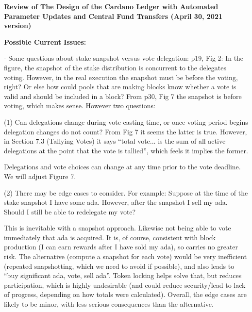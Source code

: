 \documentclass{article}
\begin{document}
\textbf{Review of The Design of the Cardano Ledger with Automated Parameter Updates 
and Central Fund Transfers (April 30, 2021 version)}

\vspace{12pt}
\begin{center}
\textbf{Possible Current Issues: }
\end{center}

\vspace{12pt}
\baselineskip=12pt
\leftskip=0pt
- Some questions about stake snapshot versus vote delegation: p19, Fig 2: In the 
figure, the snapshot of the stake distribution is concurrent to the delegates voting. 
However, in the real execution the snapshot must be before the voting, right? Or 
else how could pools that are making blocks know whether a vote is valid and should 
be included in a block? From p30, Fig 7 the snapshot is before voting, which makes 
sense. However two questions:

\parindent=18pt
(1) Can delegations change during vote casting time, or once voting period begins 
delegation changes do not count? From Fig 7 it seems the latter is true. However, 
in Section 7.3 (Tallying Votes) it says ``total vote... is the sum of all active 
delegations at the point that the vote is tallied'', which feels it implies the 
former.

\vspace{12pt}
\parindent=0pt
{\color{color02} Delegations and vote choices can change at any time prior to the 
vote deadline.  We will adjust Figure 7.}

\vspace{12pt}
\parindent=18pt
(2) There may be edge cases to consider. For example: Suppose at the time of the 
stake snapshot I have some ada. However, after the snapshot I sell my ada. Should 
I still be able to redelegate my vote?

\vspace{12pt}
\parindent=0pt
{\color{color03} This is inevitable with a snapshot approach.  Likewise not being 
able to vote immediately that ada is acquired.  It is, of course, consistent with 
block production (I can earn rewards after I have sold my ada), so carries no greater 
risk.  The alternative (compute a snapshot for each vote) would be very inefficient 
(repeated snapshotting, which we need to avoid if possible), and also leads to 
``buy significant ada, vote, sell ada''.  Token locking helps solve that, but reduces 
participation, which is highly undesirable (and could reduce security/lead to lack 
of progress, depending on how totals were calculated).  Overall, the edge cases 
are likely to be minor, with less serious consequences than the alternative.}
\end{document}

